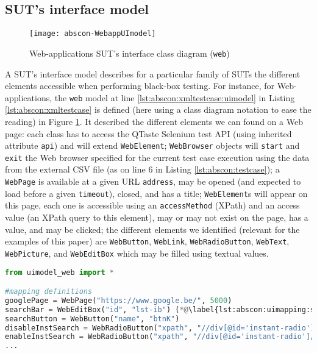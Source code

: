 \subsection{SUT's interface model}

\begin{figure}
	\centering
	\texttt{[image: abscon-WebappUImodel]}
	\caption{Web-applications SUT's interface class diagram (\texttt{web})}
	\label{fig:abscon:WebappUImodel}
\end{figure}

A SUT's interface model describes for a particular family of SUTs the different elements accessible when performing black-box testing. For instance, for Web-applications, the \texttt{web} model at line \ref{lst:abscon:xmltestcase:uimodel} in Listing \ref{lst:abscon:xmltestcase} is defined (here using a class diagram notation to ease the reading) in Figure \ref{fig:abscon:WebappUImodel}. It described the different elements we can found on a Web page: each class has to access the QTaste Selenium test API (using inherited attribute \texttt{api}) and will extend \texttt{WebElement};  \texttt{WebBrowser} objects will \texttt{start} and \texttt{exit} the Web browser specified for the current test case execution using the data from the external CSV file (as on line 6 in Listing \ref{lst:abscon:testcase}); a \texttt{WebPage} is available at a given URL  \texttt{address}, may be opened (and expected to load before a given \texttt{timeout}), closed, and has a title; \texttt{WebElement}s will appear on this page, each one is accessible using an \texttt{accessMethod} (\eg XPath) and an access value (\eg an XPath query to this element), may or may not exist on the page, has a value, and may be clicked;  the different elements we identified (relevant for the examples of this paper) are \texttt{WebButton}, \texttt{WebLink}, \texttt{WebRadioButton}, \texttt{WebText}, \texttt{WebPicture}, and \texttt{WebEditBox} which may be filled using textual values. 

\begin{lstlisting}[language=Python,
float,
label=lst:abscon:uimapping,
caption={Google instant search interface model instance (\texttt{UiMapping.py})}]
from uimodel_web import *

#mapping definitions
googlePage = WebPage("https://www.google.be/", 5000)
searchBar = WebEditBox("id", "lst-ib") (*@\label{lst:abscon:uimapping:searchbar}@*)
searchButton = WebButton("name", "btnK")
disableInstSearch = WebRadioButton("xpath", "//div[@id='instant-radio']/div[3]/span") (*@\label{lst:abscon:uimapping:disable}@*)
enableInstSearch = WebRadioButton("xpath", "//div[@id='instant-radio']/div[2]/span") (*@\label{lst:abscon:uimapping:enable}@*)
...
\end{lstlisting}

